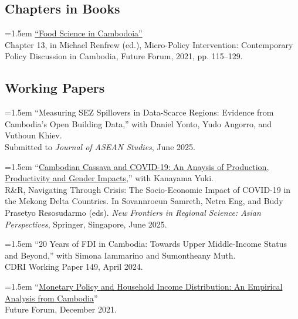 \documentclass[10pt,a4paper]{article}
\begin{document}
\subsection*{Chapters in Books}

\hangindent=1.5em
\href{https://kosalnith.github.io/research/policies/PolicyBrief-FST.pdf}{``Food Science in Cambodoia''} \\
Chapter 13, in Michael Renfrew (ed.), Micro-Policy Intervention: Contemporary Policy Discussion in Cambodia, Future Forum, 2021, pp. 115–129. 

\subsection*{Working Papers}
	\hangindent=1.5em
	``Measuring SEZ Spillovers in Data-Scarce Regions: Evidence from Cambodia's Open Building Data,'' with Daniel Yonto, Yudo Angorro, and Vuthoun Khiev. \\
	Submitted to \textit{Journal of ASEAN Studies}, June 2025. \\ \vspace{-.5em}
		
	\hangindent=1.5em
	“\href{}{Cambodian Cassava and COVID-19: An Anaysis of Production, Productivity and Gender Impacts},” with Kanayama Yuki. \\
	R\&R, Navigating Through Crisis: The Socio-Economic Impact of COVID-19 in the Mekong Delta Countries. In Sovannroeun Samreth, Netra Eng, and Budy Prasetyo Resosudarmo (eds). \textit{New Frontiers in Regional Science: Asian Perspectives}, Springer, Singapore, June 2025. \\ \vspace{-.5em} 
	
	\hangindent=1.5em
	``20 Years of FDI in Cambodia: Towards Upper Middle-Income Status and Beyond,'' with Simona Iammarino and Sumontheany Muth. \\
	CDRI Working Paper 149, April 2024. \\ \vspace{-.5em}
	
	\hangindent=1.5em
	“\href{https://kosalnith.github.io/research/papers/MPHI.pdf}{Monetary Policy and Household Income Distribution: An Empirical Analysis from Cambodia}” \\
	Future Forum, December 2021. 
\end{document}
